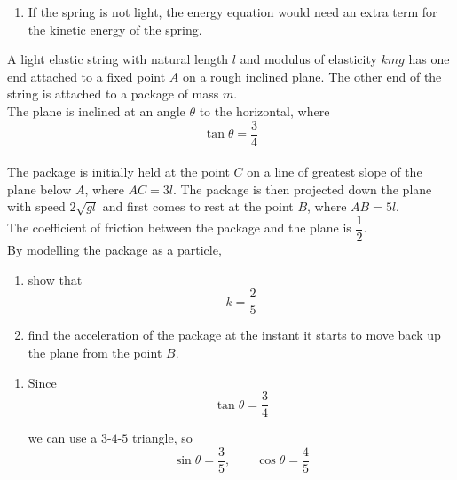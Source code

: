\documentclass[leqno]{article}
\begin{document}
\begin{enumerate}[
  label=\textbf{\arabic*.},
  leftmargin=*,
  topsep=0pt,
  partopsep=0pt,
  parsep=0pt
]
\begin{djsSolution}
\begin{enumerate}[label=\textbf{(\alph*)}, start=1]
\begin{enumerate}[label=\textbf{(\roman*)}, start=1]
Taking the positive root:
\[
v=2\sqrt{\frac{ag}{3}}
\]


  \end{enumerate}

  \item If the spring is not light, the energy equation would need an extra term for the kinetic energy of the spring.
\end{enumerate}
\end{djsSolution}


\newpage

\questionitem

A light elastic string with natural length $l$ and modulus of elasticity $kmg$ has one end attached to a fixed point $A$ on a rough inclined plane. The other end of the string is attached to a package of mass $m$. \\
The plane is inclined at an angle $\theta$ to the horizontal, where
\[
\tan \theta = \dfrac{3}{4}
\] \\
The package is initially held at the point $C$ on a line of greatest slope of the plane below $A$, where $AC = 3l$. The package is then projected down the plane with speed $2\sqrt{gl}$ and first comes to rest at the point $B$, where $AB = 5l$. \\
The coefficient of friction between the package and the plane is $\dfrac{1}{2}$. \\
By modelling the package as a particle, \\
\begin{enumerate}[label=\textbf{(\alph*)}]
  \item show that
  \[
  k = \dfrac{2}{5}
  \]
  \item find the acceleration of the package at the instant it starts to move back up the plane from the point $B$.  \\
\end{enumerate}

\vspace*{10pt}

\begin{djsSolution}
\begin{enumerate}[label=\textbf{(\alph*)}, start=1]
  \item Since
  \[
  \tan\theta=\frac34
  \]

  we can use a $3$-$4$-$5$ triangle, so
  \[
  \sin\theta=\frac35,
  \qquad
  \cos\theta=\frac45
  \]


\end{enumerate}
\end{djsSolution}
\end{enumerate}
\end{document}

